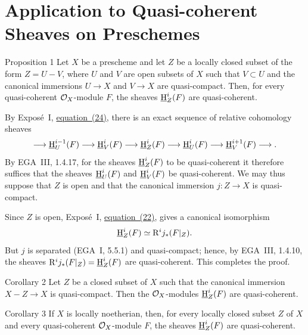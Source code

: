 
\makeatletter
\providecommand{\sgareaderlabel}[2]{%
  \begingroup
  \def\@currentlabel{#2}%
  \phantomsection\label{#1}%
  \endgroup}
\makeatother

\chapter[Quasi-coherent Sheaves on Preschemes]
{Application to Quasi-coherent Sheaves on Preschemes}
\label{II}

\begin{sgastatement}{Proposition 1}\sgareaderlabel{II.1}{1}
Let $X$ be a prescheme and let $Z$ be a locally closed subset of
the form $Z=U-V$, where $U$ and $V$ are open subsets of $X$ such that
$V\subset U$ and the canonical immersions $U\to X$ and $V\to X$ are
quasi-compact. Then, for every quasi-coherent $\mathcal O_X$-module $F$, the sheaves
$\mathop{\underline{\mathrm H}}\nolimits_Z^i(F)$ are quasi-coherent.
\end{sgastatement}

By Expos\'e~I, \hyperref[eq:I.24]{equation~(24)}, there is an exact sequence of relative
cohomology sheaves
\[
  \longrightarrow \mathop{\underline{\mathrm H}}\nolimits_U^{i-1}(F)
  \longrightarrow \mathop{\underline{\mathrm H}}\nolimits_V^i(F)
  \longrightarrow \mathop{\underline{\mathrm H}}\nolimits_Z^i(F)
  \longrightarrow \mathop{\underline{\mathrm H}}\nolimits_U^i(F)
  \longrightarrow \mathop{\underline{\mathrm H}}\nolimits_V^{i+1}(F)
  \longrightarrow .
\]
By EGA~III, 1.4.17, for the sheaves $\mathop{\underline{\mathrm H}}\nolimits_Z^i(F)$ to be quasi-coherent it
therefore suffices that the sheaves $\mathop{\underline{\mathrm H}}\nolimits_U^i(F)$ and $\mathop{\underline{\mathrm H}}\nolimits_V^i(F)$ be
quasi-coherent. We may thus suppose that $Z$ is open and that the canonical
immersion $j\colon Z\to X$ is quasi-compact.

Since $Z$ is open, Expos\'e~I, \hyperref[eq:I.22]{equation~(22)}, gives a canonical isomorphism
\[
  \mathop{\underline{\mathrm H}}\nolimits_Z^i(F)\simeq \mathrm R^i j_*(F|_Z).
\]
But $j$ is separated (EGA~I, 5.5.1) and quasi-compact; hence, by EGA~III,
1.4.10, the sheaves
$\mathrm R^i j_*(F|_Z)=\mathop{\underline{\mathrm H}}\nolimits_Z^i(F)$ are quasi-coherent. This completes the
proof.

\begin{sgastatement}{Corollary 2}\sgareaderlabel{II.2}{2}
Let $Z$ be a closed subset of $X$ such that the canonical immersion
$X-Z\to X$ is quasi-compact. Then the $\mathcal O_X$-modules $\mathop{\underline{\mathrm H}}\nolimits_Z^i(F)$ are
quasi-coherent.
\end{sgastatement}

\begin{sgastatement}{Corollary 3}\sgareaderlabel{II.3}{3}
If $X$ is locally noetherian, then, for every locally closed subset $Z$ of
$X$ and every quasi-coherent $\mathcal O_X$-module $F$, the sheaves $\mathop{\underline{\mathrm H}}\nolimits_Z^i(F)$ are
quasi-coherent.
\end{sgastatement}


